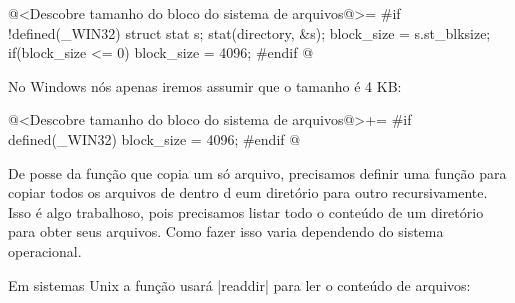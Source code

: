 \iniciocodigo
@<Descobre tamanho do bloco do sistema de arquivos@>=
#if !defined(_WIN32)
{
  struct stat s;
  stat(directory, &s);
  block_size = s.st_blksize;
  if(block_size <= 0){
    block_size = 4096;
  }
}
#endif
@
\fimcodigo

No Windows nós apenas iremos assumir que o tamanho é 4 KB:

\iniciocodigo
@<Descobre tamanho do bloco do sistema de arquivos@>+=
#if defined(_WIN32)
  block_size = 4096;
#endif
@
\fimcodigo


De posse da função que copia um só arquivo, precisamos definir uma
função para copiar todos os arquivos de dentro d eum diretório para
outro recursivamente. Isso é algo trabalhoso, pois precisamos listar
todo o conteúdo de um diretório para obter seus arquivos. Como fazer
isso varia dependendo do sistema operacional.


Em sistemas Unix a função usará |readdir| para ler o conteúdo de
arquivos:

